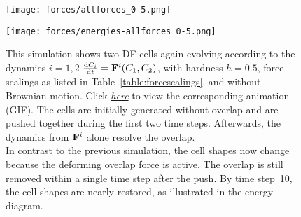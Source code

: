 \begin{figure}[htbp]
	\centering
	\texttt{[image: forces/allforces\_0-5.png]}\\[1ex]
	\begin{minipage}[c]{0.35\textwidth}
		\texttt{[image: forces/energies-allforces\_0-5.png]}
	\end{minipage}\hfill
	\begin{minipage}[c]{0.6\textwidth}
		\caption{
			This simulation shows two DF cells again evolving according to the dynamics $i=1,2$ $\frac{\mathrm{d} C_i}{\mathrm{d} t} = \mathbf{F}^i(C_1, C_2)$, with hardness $h=0.5$, force scalings as listed in Table~\ref{table:forcescalings}, and without Brownian motion.
			Click \href{https://github.com/tivo476c/FlexibleCellModel/blob/master/figures/gifs/showForces/show-allForces-hard5e-1.gif}{\textit{here}} to view the corresponding animation (GIF).
			The cells are initially generated without overlap and are pushed together during the first two time steps. Afterwards, the dynamics from $\mathbf{F}^i$ alone resolve the overlap.\\
			In contrast to the previous simulation, the cell shapes now change because the deforming overlap force is active. 
			The overlap is still removed within a single time step after the push. 
			By time step~10, the cell shapes are nearly restored, as illustrated in the energy diagram.
			}
		\label{fig:allForces-half}
	\end{minipage}
\end{figure}

